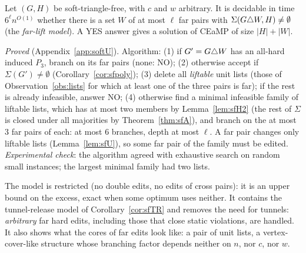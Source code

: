 \begin{theorem}\label{thm:U}
Let $(G,H)$ be soft-triangle-free, with $c$ and $w$ arbitrary. It is decidable in time $6^{\ell}n^{O(1)}$ whether there is a set $W$ of at most $\ell$ far pairs with $\Sigma(G\triangle W,H)\ne\emptyset$ (the \emph{far-lift model}). A YES answer gives a solution of CEaMP of size $|H|+|W|$.
\end{theorem}
\emph{Proved} (Appendix~\ref{app:softU}). Algorithm: (1) if $G'=G\triangle W$ has an all-hard induced $P_3$, branch on its far pairs (none: NO); (2) otherwise accept if $\Sigma(G')\ne\emptyset$ (Corollary~\ref{cor:sfpoly}); (3) delete all \emph{liftable} unit lists (those of Observation~\ref{obs:lists} for which at least one of the three pairs is far); if the rest is already infeasible, answer NO; (4) otherwise find a minimal infeasible family of liftable lists, which has at most two members by Lemma~\ref{lem:sfH2} (the rest of $\Sigma$ is closed under all majorities by Theorem~\ref{thm:sfA}), and branch on the at most $3$ far pairs of each: at most $6$ branches, depth at most $\ell$. A far pair changes only liftable lists (Lemma~\ref{lem:sfU}), so some far pair of the family must be edited. \emph{Experimental check}: the algorithm agreed with exhaustive search on random small instances; the largest minimal family had two lists.

The model is restricted (no double edits, no edits of cross pairs): it is an upper bound on the excess, exact when some optimum uses neither. It contains the tunnel-release model of Corollary~\ref{cor:sfTR} and removes the need for tunnels: \emph{arbitrary} far hard edits, including those that close static violations, are handled. It also shows what the cores of far edits look like: a pair of unit lists, a vertex-cover-like structure whose branching factor depends neither on $n$, nor $c$, nor $w$.


